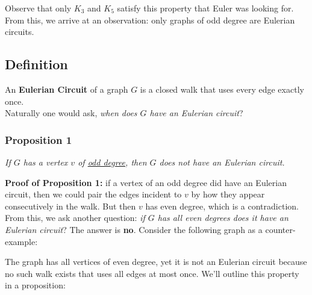 \documentclass{report}
\begin{document}
Observe that only $K_3$ and $K_5$ satisfy this property that Euler was looking for. From this, we arrive at an observation: only graphs of odd degree are Eulerian circuits.
\subsection{Definition}
An \textbf{Eulerian Circuit} of a graph $G$ is a closed walk that uses every edge exactly once.\\
Naturally one would ask, \textit{when does $G$ have an Eulerian circuit}?
\subsubsection{Proposition 1}
\begin{center}
\textit{If $G$ has a vertex $v$ of \underline{odd degree}, then $G$ does not have an Eulerian circuit.}
\end{center}
\textbf{Proof of Proposition 1:} if a vertex of an odd degree did have an Eulerian circuit, then we could pair the edges incident to $v$ by how they appear consecutively in the walk. But then $v$ has even degree, which is a contradiction. \\
From this, we ask another question: \textit{if $G$ has all even degrees does it have an Eulerian circuit}? The answer is \textbf{no}. Consider the following graph as a counter-example:
\begin{center}
\end{center}
The graph has all vertices of even degree, yet it is not an Eulerian circuit because no such walk exists that uses all edges at most once. We'll outline this property in a proposition:
\end{document}
